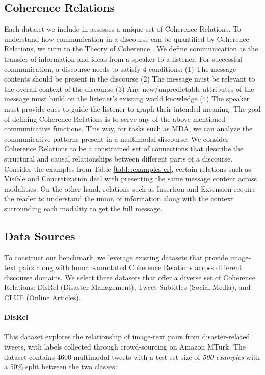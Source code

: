 \subsection{Coherence Relations}
Each dataset we include in {\name} assesses a unique set of Coherence Relations. To understand how communication in a discourse can be quantified by Coherence Relations, we turn to the Theory of Coherence \cite{Hobbs1978-em}. We define communication as the transfer of information and ideas from a speaker to a listener. For successful communication, a discourse needs to satisfy 4 conditions: (1) The message contents should be present in the discourse (2) The message must be relevant to the overall context of the discourse (3) Any new/unpredictable attributes of the message must build on the listener's existing world knowledge (4) The speaker must provide cues to guide the listener to graph their intended meaning. The goal of defining Coherence Relations is to serve any of the above-mentioned communicative functions. This way, for tasks such as MDA, we can analyze the communicative patterns present in a multimodal discourse. We consider Coherence Relations to be a constrained set of connections that describe the structural and causal relationships between different parts of a discourse. Consider the examples from Table \ref{table:examples-cr}, certain relations such as Visible and Concretization deal with presenting the same message content across modalities. On the other hand, relations such as Insertion and Extension require the reader to understand the union of information along with the context surrounding each modality to get the full message.

\subsection{Data Sources} \label{data-sources}
To construct our benchmark, we leverage existing datasets that provide image-text pairs along with human-annotated Coherence Relations across different discourse domains. We select three datasets that offer a diverse set of Coherence Relations: DisRel (Disaster Management), Tweet Subtitles (Social Media), and CLUE (Online Articles).

\paragraph{DisRel} 
This dataset \cite{Sosea2021-hr} explores the relationship of image-text pairs from disaster-related tweets, with labels collected through crowd-sourcing on Amazon MTurk. The dataset contains 4600 multimodal tweets with a test set size of \textit{500 examples} with a 50\% split between the two classes:

